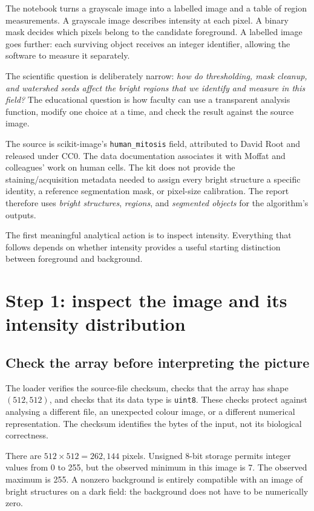 \documentclass[11pt,letterpaper]{article}
\newcommand{\field}[1]{\nolinkurl{#1}}
\begin{document}
The notebook turns a grayscale image into a labelled image and a table of region measurements. A grayscale image describes intensity at each pixel. A binary mask decides which pixels belong to the candidate foreground. A labelled image goes further: each surviving object receives an integer identifier, allowing the software to measure it separately.

The scientific question is deliberately narrow: \emph{how do thresholding, mask cleanup, and watershed seeds affect the bright regions that we identify and measure in this field?} The educational question is how faculty can use a transparent analysis function, modify one choice at a time, and check the result against the source image.

The source is scikit-image's \field{human_mitosis} field, attributed to David Root and released under CC0. The data documentation associates it with Moffat and colleagues' work on human cells.\cite{data} The kit does not provide the staining/acquisition metadata needed to assign every bright structure a specific identity, a reference segmentation mask, or pixel-size calibration. The report therefore uses \emph{bright structures}, \emph{regions}, and \emph{segmented objects} for the algorithm's outputs.

The first meaningful analytical action is to inspect intensity. Everything that follows depends on whether intensity provides a useful starting distinction between foreground and background.

\section{Step 1: inspect the image and its intensity distribution}
\label{sec:intensity}

\subsection{Check the array before interpreting the picture}
The loader verifies the source-file checksum, checks that the array has shape $(512,512)$, and checks that its data type is \field{uint8}. These checks protect against analysing a different file, an unexpected colour image, or a different numerical representation. The checksum identifies the bytes of the input, not its biological correctness.

There are $512\times512=262{,}144$ pixels. Unsigned 8-bit storage permits integer values from 0 to 255, but the observed minimum in this image is 7. The observed maximum is 255. A nonzero background is entirely compatible with an image of bright structures on a dark field: the background does not have to be numerically zero.
\end{document}
